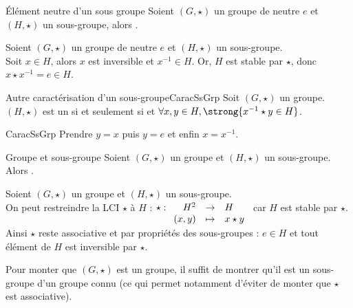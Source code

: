 \documentclass[12pt,a4paper]{report}
\begin{document}
    \begin{proposition}{Élément neutre d'un sous groupe}{}
    Soient $(G, \star)$ un groupe de neutre $e$ et $(H, \star)$ un sous-groupe, alors .
    \end{proposition}
    
    \begin{demo}
    Soient $(G, \star)$ un groupe de neutre $e$ et $(H, \star)$ un sous-groupe.\\
    Soit $x \in H$, alors $x$ est inversible et $x^{-1} \in H$. Or, $H$ est stable par $\star$, donc $x \star x^{-1} = e \in H$.
    \end{demo}
    
    \begin{proposition}{Autre caractérisation d'un sous-groupe}{CaracSsGrp}
    Soit $(G, \star)$ un groupe.\\
    $(H, \star)$ est un  si et seulement si  et $\forall x, y \in H, \strong{x^{-1} \star y \in H}$.
    \end{proposition}
    
    \begin{principedemo}{CaracSsGrp}
    Prendre $y = x$ puis $y = e$ et enfin $x = x^{-1}$.
    \end{principedemo}
    
    \begin{theoreme}{Groupe et sous-groupe}{}
    Soient $(G, \star)$ un groupe et $(H, \star)$ un sous-groupe. Alors .
    \end{theoreme}
    
    \begin{demo}
    Soient $(G, \star)$ un groupe et $(H, \star)$ un sous-groupe.\\
    On peut restreindre la LCI $\star$ à $H$ : $\star : \begin{array}[t]{rcl} H^2 & \rightarrow & H \\ (x, y) & \mapsto & x \star y \end{array}$ car $H$ est stable par $\star$.\\
    Ainsi $\star$ reste associative et par propriétés des sous-groupes : $e \in H$ et tout élément de $H$ est inversible par $\star$.
    \end{demo}
    
    \begin{remarque}
    Pour monter que $(G, \star)$ est un groupe, il suffit de montrer qu'il est un sous-groupe d'un groupe connu (ce qui permet notamment d'éviter de monter que $\star$ est associative).
    \end{remarque}
    
\end{document}
